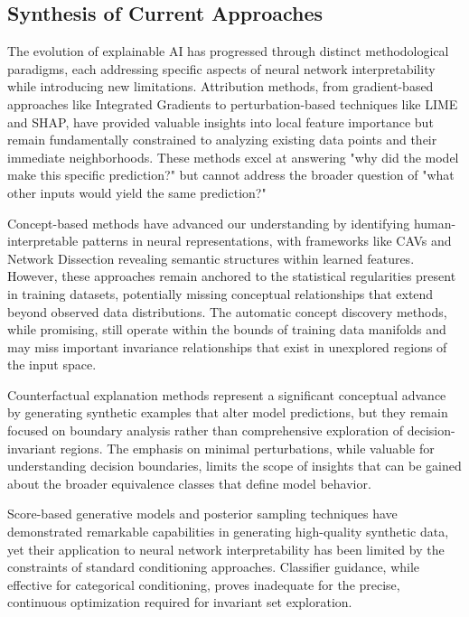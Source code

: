 \subsection{Synthesis of Current Approaches}

The evolution of explainable AI has progressed through distinct methodological paradigms, each addressing specific aspects of neural network interpretability while introducing new limitations. Attribution methods, from gradient-based approaches like Integrated Gradients to perturbation-based techniques like LIME and SHAP, have provided valuable insights into local feature importance but remain fundamentally constrained to analyzing existing data points and their immediate neighborhoods. These methods excel at answering "why did the model make this specific prediction?" but cannot address the broader question of "what other inputs would yield the same prediction?"

Concept-based methods have advanced our understanding by identifying human-interpretable patterns in neural representations, with frameworks like CAVs and Network Dissection revealing semantic structures within learned features. However, these approaches remain anchored to the statistical regularities present in training datasets, potentially missing conceptual relationships that extend beyond observed data distributions. The automatic concept discovery methods, while promising, still operate within the bounds of training data manifolds and may miss important invariance relationships that exist in unexplored regions of the input space.

Counterfactual explanation methods represent a significant conceptual advance by generating synthetic examples that alter model predictions, but they remain focused on boundary analysis rather than comprehensive exploration of decision-invariant regions. The emphasis on minimal perturbations, while valuable for understanding decision boundaries, limits the scope of insights that can be gained about the broader equivalence classes that define model behavior.

Score-based generative models and posterior sampling techniques have demonstrated remarkable capabilities in generating high-quality synthetic data, yet their application to neural network interpretability has been limited by the constraints of standard conditioning approaches. Classifier guidance, while effective for categorical conditioning, proves inadequate for the precise, continuous optimization required for invariant set exploration.

